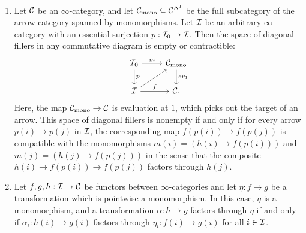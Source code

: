\documentclass[10pt,a4paper,oneside]{article}
\begin{document}
\begin{prop}\label{monolem}\,
\begin{enumerate}[label=(\arabic*),font=\normalfont]

\item Let $\mathcal{C}$ be an $\infty$-category, and let $\mathcal{C}_{\operatorname{mono}} \subseteq \mathcal{C}^{\Delta^1}$ be the full subcategory of the arrow category spanned by monomorphisms. Let $\mathcal{I}$ be an arbitrary $\infty$-category with an essential surjection $p: \mathcal{I}_0 \rightarrow \mathcal{I}$. Then the space of diagonal fillers in any commutative diagram is empty or contractible:
\[
\begin{tikzcd}
\mci_0 \arrow[d, "p"] \arrow[r, "m"]        & \mcc_{\op{mono}} \arrow[d, "ev_1"] \\
\mci \arrow[r, "f"] \arrow[ru, dashed] & \mcc.                              
\end{tikzcd}
\]
Here, the map $\mathcal{C}_{\operatorname{mono}} \rightarrow \mathcal{C}$ is evaluation at $1$, which picks out the target of an arrow. This space of diagonal fillers is nonempty if and only if for every arrow $p(i) \rightarrow p(j)$ in $\mathcal{I}$, the corresponding map $f(p(i)) \rightarrow f(p(j))$ is compatible with the monomorphisms $m(i)=\left(h(i) \rightarrow f(p(i))\right)$ and $m(j)=\left(h(j) \rightarrow f(p(j))\right)$ in the sense that the composite $h(i) \rightarrow f(p(i)) \rightarrow f(p(j))$ factors through $h(j)$.
\item  Let $f, g, h: \mathcal{I} \rightarrow \mathcal{C}$ be functors between $\infty$-categories and let $\eta: f \rightarrow g$ be a transformation which is pointwise a monomorphism. In this case, $\eta$ is a monomorphism, and a transformation $\alpha: h \rightarrow g$ factors through $\eta$ if and only if $\alpha_i: h(i) \rightarrow g(i)$ factors through $\eta_i: f(i) \rightarrow g(i)$ for all $i \in \mathcal{I}$.
\end{enumerate}
\end{prop}
\end{document}
